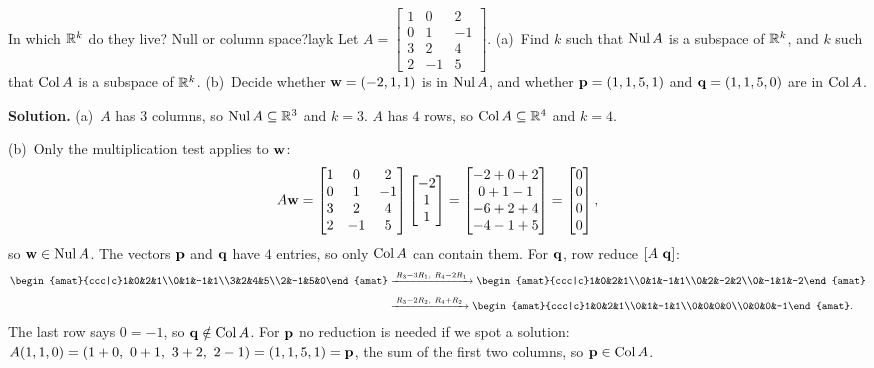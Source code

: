\documentclass[11pt]{article}
\begin{document}
\begin{exmp}{In which $\mathbb{R}^k$ do they live? Null or column space?}{layk}
Let $A=\begin{bmatrix}1&0&2\\0&1&-1\\3&2&4\\2&-1&5\end{bmatrix}$. (a)~Find $k$ such that $\operatorname{Nul} A$ is a subspace of $\mathbb{R}^k$, and $k$ such that $\operatorname{Col} A$ is a subspace of $\mathbb{R}^k$. (b)~Decide whether $\mathbf{w}=(-2,1,1)$ is in $\operatorname{Nul} A$, and whether $\mathbf{p}=(1,1,5,1)$ and $\mathbf{q}=(1,1,5,0)$ are in $\operatorname{Col} A$.

\textbf{Solution.} (a)~$A$ has $3$ columns, so $\operatorname{Nul} A\subseteq\mathbb{R}^3$ and $k=3$. $A$ has $4$ rows, so $\operatorname{Col} A\subseteq\mathbb{R}^4$ and $k=4$.

(b)~Only the multiplication test applies to $\mathbf{w}$:
\[
A\mathbf{w}=\begin{bmatrix}1&0&2\\0&1&-1\\3&2&4\\2&-1&5\end{bmatrix}\begin{bmatrix}-2\\1\\1\end{bmatrix}=\begin{bmatrix}-2+0+2\\0+1-1\\-6+2+4\\-4-1+5\end{bmatrix}=\begin{bmatrix}0\\0\\0\\0\end{bmatrix},
\]
so $\mathbf{w}\in\operatorname{Nul} A$. The vectors $\mathbf{p}$ and $\mathbf{q}$ have $4$ entries, so only $\operatorname{Col} A$ can contain them. For $\mathbf{q}$, row reduce $[A\ \mathbf{q}]$:
\begin{align*}
\begin{amat}{ccc|c}1&0&2&1\\0&1&-1&1\\3&2&4&5\\2&-1&5&0\end{amat}
&\rops{R_3-3R_1,\ R_4-2R_1}
\begin{amat}{ccc|c}1&0&2&1\\0&1&-1&1\\0&2&-2&2\\0&-1&1&-2\end{amat}\\[4pt]
&\rops{R_3-2R_2,\ R_4+R_2}
\begin{amat}{ccc|c}1&0&2&1\\0&1&-1&1\\0&0&0&0\\0&0&0&-1\end{amat}.
\end{align*}
The last row says $0=-1$, so $\mathbf{q}\notin\operatorname{Col} A$. For $\mathbf{p}$ no reduction is needed if we spot a solution: $A(1,1,0)=(1+0,\ 0+1,\ 3+2,\ 2-1)=(1,1,5,1)=\bv{p}$, the sum of the first two columns, so $\mathbf{p}\in\operatorname{Col} A$.
\end{exmp}
\end{document}
